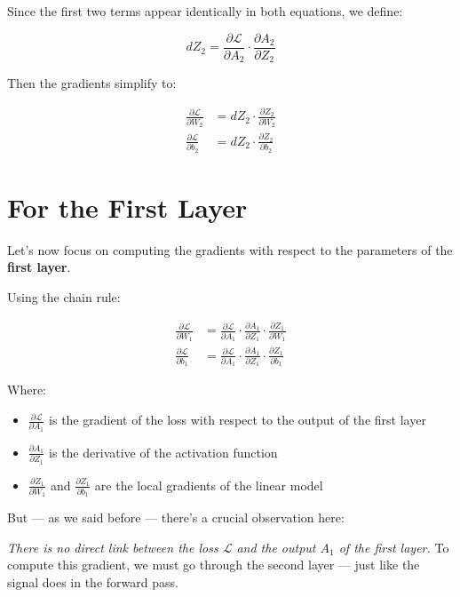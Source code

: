 \documentclass[11pt]{article}
\begin{document}
Since the first two terms appear identically in both equations, we define:

\[
dZ_2 = \frac{\partial \mathcal{L}}{\partial A_2} \cdot \frac{\partial A_2}{\partial Z_2}
\]

Then the gradients simplify to:

\[
\begin{aligned}
\frac{\partial \mathcal{L}}{\partial W_2} &= dZ_2 \cdot \frac{\partial Z_2}{\partial W_2} \\
\frac{\partial \mathcal{L}}{\partial b_2} &= dZ_2 \cdot \frac{\partial Z_2}{\partial b_2}
\end{aligned}
\]

\section{For the First Layer}

Let’s now focus on computing the gradients with respect to the parameters of the \textbf{first layer}.

Using the chain rule:

\[
\begin{aligned}
\frac{\partial \mathcal{L}}{\partial W_1} &= 
\frac{\partial \mathcal{L}}{\partial A_1} \cdot 
\frac{\partial A_1}{\partial Z_1} \cdot 
\frac{\partial Z_1}{\partial W_1} \\[1em]
\frac{\partial \mathcal{L}}{\partial b_1} &= 
\frac{\partial \mathcal{L}}{\partial A_1} \cdot 
\frac{\partial A_1}{\partial Z_1} \cdot 
\frac{\partial Z_1}{\partial b_1}
\end{aligned}
\]

Where:
\begin{itemize}
    \item $\frac{\partial \mathcal{L}}{\partial A_1}$ is the gradient of the loss with respect to the output of the first layer
    \item $\frac{\partial A_1}{\partial Z_1}$ is the derivative of the activation function
    \item $\frac{\partial Z_1}{\partial W_1}$ and $\frac{\partial Z_1}{\partial b_1}$ are the local gradients of the linear model
\end{itemize}

But — as we said before — there's a crucial observation here:

\textit{There is no direct link between the loss $\mathcal{L}$ and the output $A_1$ of the first layer.}  
To compute this gradient, we must go through the second layer — just like the signal does in the forward pass.
\end{document}
